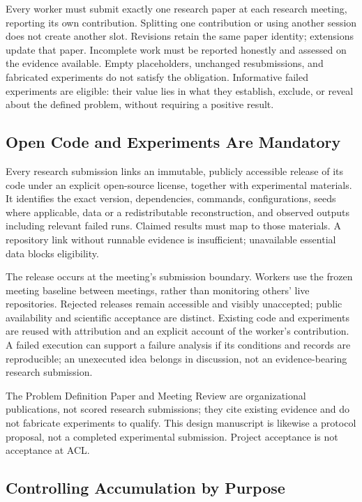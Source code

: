 \documentclass[11pt]{article}
\begin{document}
Every worker must submit exactly one research paper at each research meeting, reporting its own contribution. Splitting one contribution or using another session does not create another slot. Revisions retain the same paper identity; extensions update that paper. Incomplete work must be reported honestly and assessed on the evidence available. Empty placeholders, unchanged resubmissions, and fabricated experiments do not satisfy the obligation. Informative failed experiments are eligible: their value lies in what they establish, exclude, or reveal about the defined problem, without requiring a positive result.

\subsection{Open Code and Experiments Are Mandatory}

Every research submission links an immutable, publicly accessible release of its code under an explicit open-source license, together with experimental materials. It identifies the exact version, dependencies, commands, configurations, seeds where applicable, data or a redistributable reconstruction, and observed outputs including relevant failed runs. Claimed results must map to those materials. A repository link without runnable evidence is insufficient; unavailable essential data blocks eligibility.

The release occurs at the meeting's submission boundary. Workers use the frozen meeting baseline between meetings, rather than monitoring others' live repositories. Rejected releases remain accessible and visibly unaccepted; public availability and scientific acceptance are distinct. Existing code and experiments are reused with attribution and an explicit account of the worker's contribution. A failed execution can support a failure analysis if its conditions and records are reproducible; an unexecuted idea belongs in discussion, not an evidence-bearing research submission.

The Problem Definition Paper and Meeting Review are organizational publications, not scored research submissions; they cite existing evidence and do not fabricate experiments to qualify. This design manuscript is likewise a protocol proposal, not a completed experimental submission. Project acceptance is not acceptance at ACL.

\subsection{Controlling Accumulation by Purpose}
\end{document}
